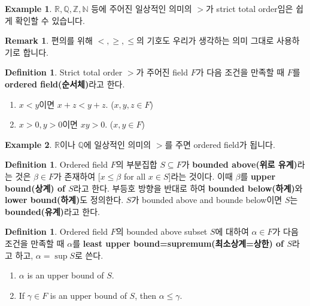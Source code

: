 \documentclass[12pt]{article}
\theoremstyle{definition}
\newtheorem{defn}[thm]{Definition}
\newtheorem*{rem}{Remark}
\newtheorem*{ex}{Example}
\def\NN{\mathbb{N}}
\def\ZZ{\mathbb{Z}}
\def\QQ{\mathbb{Q}}
\def\RR{\mathbb{R}}
\begin{document}
	\begin{ex}
		\(\RR, \QQ, \ZZ, \NN\) 등에 주어진 일상적인 의미의 \(>\)가 strict total order임은 쉽게 확인할 수 있습니다.
	\end{ex}

	\begin{rem}
		편의를 위해 \(<, \ge, \le\)의 기호도 우리가 생각하는 의미 그대로 사용하기로 합니다.
	\end{rem}

	\begin{defn}
		Strict total order \(>\)가 주어진 field \(F\)가 다음 조건을 만족할 때 \(F\)를 \textbf{ordered field(순서체)}라고 한다.
		\begin{enumerate} [label=(\alph*), leftmargin=2\parindent]
			\item
			\(x < y\)이면 \(x + z < y + z\). (\(x, y, z \in F\))
			\item
			\(x > 0, y > 0\)이면 \(xy > 0\). (\(x, y \in F\))
		\end{enumerate}
	\end{defn}

	\begin{ex}
		\(\RR\)이나 \(\QQ\)에 일상적인 의미의 \(>\)를 주면 ordered field가 됩니다.
	\end{ex}

	\begin{defn} \label{bdd in R}
		Ordered field \(F\)의 부분집합 \(S \subseteq F\)가 \textbf{bounded above(위로 유계)}라는 것은 \(\beta \in F\)가 존재하여 [\(x \le \beta\) for all \(x \in S\)]라는 것이다. 이때 \(\beta\)를 \textbf{upper bound(상계) of \(S\)}라고 한다. 부등호 방향을 반대로 하여 \textbf{bounded below(하계)}와 \textbf{lower bound(하계)}도 정의한다. \(S\)가 bounded above and bounde below이면 \(S\)는 \textbf{bounded(유계)}라고 한다.
	\end{defn}
	
	\begin{defn}
		Ordered field \(F\)의 bounded above subset \(S\)에 대하여 \(\alpha \in F\)가 다음 조건을 만족할 때 \(\alpha\)를 \textbf{least upper bound=supremum(최소상계=상한) of \(S\)}라고 하고, \(\alpha = \sup S\)로 쓴다.
		\begin{enumerate} [label=(\alph*), leftmargin=2\parindent]
			\item
			\(\alpha\) is an upper bound of \(S\).
			\item
			If \(\gamma \in F\) is an upper bound of \(S\), then \(\alpha \le \gamma\).
		\end{enumerate}
	\end{defn}
\end{document}
